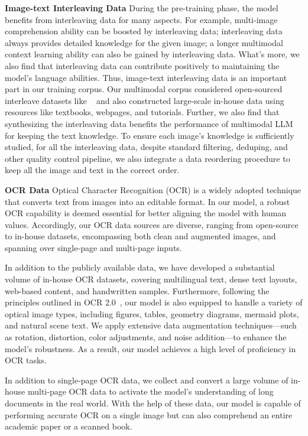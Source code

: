 \documentclass{article}
\newcommand{\citep}[1]{\parencite{#1}}
\begin{document}
\textbf{Image-text Interleaving Data}
During the pre-training phase, the model benefits from interleaving data for many aspects. For example, multi-image comprehension ability can be boosted by interleaving data; interleaving data always provides detailed knowledge for the given image; a longer multimodal context learning ability can also be gained by interleaving data. What's more, we also find that interleaving data can contribute positively to maintaining the model’s language abilities. 
Thus, image-text interleaving data is an important part in our training corpus. 
Our multimodal corpus considered open-sourced interleave datasets like ~\citep{zhu2024multimodal,laurenccon2024obelics} and also constructed large-scale in-house data using resources like textbooks, webpages, and tutorials.
Further, we also find that synthesizing the interleaving data benefits the performance of multimodal LLM for keeping the text knowledge.  
To ensure each image's knowledge is sufficiently studied, for all the interleaving data, despite standard filtering, deduping, and other quality control pipeline, we also integrate a data reordering procedure to keep all the image and text in the correct order.  
 
\textbf{OCR Data} 
Optical Character Recognition (OCR) is a widely adopted technique that converts text from images into an editable format. In our model, a robust OCR capability is deemed essential for better aligning the model with human values. Accordingly, our OCR data sources are diverse, ranging from open-source to in-house datasets, encompassing both clean and augmented images, and spanning over single-page and multi-page inputs.

In addition to the publicly available data, we have developed a substantial volume of in-house OCR datasets, covering multilingual text, dense text layouts, web-based content, and handwritten samples. 
Furthermore, following the principles outlined in OCR 2.0~\citep{wei2024general}, our model is also equipped to handle a variety of optical image types, including figures, tables, geometry diagrams, mermaid plots, and natural scene text. We apply extensive data augmentation techniques—such as rotation, distortion, color adjustments, and noise addition—to enhance the model’s robustness. As a result, our model achieves a high level of proficiency in OCR tasks.

In addition to single-page OCR data, we collect and convert a large volume of in-house multi-page OCR data to activate the model's understanding of long documents in the real world. With the help of these data, our model is capable of performing accurate OCR on a single image but can also comprehend an entire academic paper or a scanned book.
\end{document}
